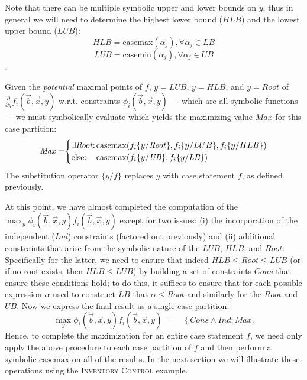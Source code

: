 \documentclass[twoside,11pt]{article}
\newcommand{\casemax}{\mathrm{casemax}}
\newcommand{\casemin}{\mathrm{casemin}}
\newcommand{\UB}{\mathit{UB}}
\newcommand{\LB}{\mathit{LB}}
\newcommand{\IND}{\mathit{Ind}}
\newcommand{\CONS}{\mathit{Cons}}
\newcommand{\Root}{\mathit{Root}}
\newcommand{\Max}{\mathit{Max}}
\newcommand{\sq}{\hspace{-1mm}}
\newcommand{\sqm}{\hspace{-2mm}}
\newcommand{\InventoryControl}{\textsc{Inventory Control }}
\begin{document}
Note that there can be multiple symbolic upper and lower
bounds on $y$, thus in general we will need to determine the highest lower bound ($HLB$) and the lowest upper bound ($LUB$): 
$$HLB = \casemax(\alpha_j), \forall \alpha_j \in \LB$$  $$LUB = \casemin(\alpha_j), \forall \alpha_j \in \UB$$.

Given the \emph{potential} maximal points of $f$, $y = LUB$, $y = HLB$, and
$y = \Root$ of $\frac{\partial}{\partial y} f_i(\vec{b},\vec{x},y)$
w.r.t. constraints $\phi_i(\vec{b},\vec{x},y)$ --- which are all
symbolic functions --- we must symbolically evaluate which yields the
maximizing value $\Max$ for this case partition:
\vspace{2mm}
{%
\begin{align*}
\Max =  \sq \begin{cases}
\mbox{$\exists \Root$}  \sq: \sq & \sqm \casemax( f_i \{ y / \Root \}, f_i \{ y / LUB \}, f_i \{ y / HLB \})\\
\mbox{else}  \sq:  \sq & \sqm \casemax( f_i \{ y / \UB \}, f_i \{ y / \LB \})
\end{cases}
\end{align*}}
The 
substitution operator $\{ y / f \}$ replaces $y$ with case statement $f$, as defined previously.

At this point, we have almost completed the computation
of the $\max_y \phi_i(\vec{b},\vec{x},y) f_i(\vec{b},\vec{x},y)$
except for two issues: (i) the incorporation of the independent ($\IND$) constraints
(factored out previously) and (ii) additional constraints that arise from the
symbolic nature of the $LUB$, $HLB$, and $\Root$. Specifically for the latter, we need to ensure that indeed $HLB \leq \Root \leq LUB$
(or if no root exists, then $HLB \leq LUB$) by building a set
of constraints $\CONS$ that ensure these conditions hold; to do this,
it suffices to ensure that for each possible expression $\alpha$ used to
construct $\LB$ that $\alpha \leq \Root$ and similarly for the $Root$ and $\UB$.
Now we express the final result as a single case partition:
\begin{equation*}
\max_y \phi_i(\vec{b},\vec{x},y) f_i(\vec{b},\vec{x},y) \;\; = \;\;
\left\{ \CONS \land \IND: \Max \right..
\end{equation*}
Hence, to complete the maximization for an entire case statement $f$, we need only apply the above procedure to each case partition of $f$ and then perform a symbolic $\casemax$ on all of the results. In the next section we will illustrate these operations using the \InventoryControl example.  
\end{document}
